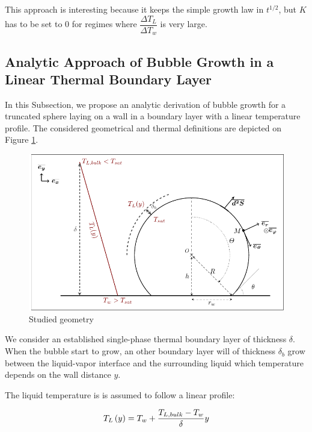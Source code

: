 \begin{remark*}{}
This approach is interesting because it keeps the simple growth law in $t^{1/2}$, but $K$ has to be set to 0 for regimes where $\dfrac{\Delta T_{L}}{\Delta T_{w}}$ is very large.%
\end{remark*}


\subsection{Analytic Approach of Bubble Growth in a Linear Thermal Boundary Layer}

In this Subsection, we propose an analytic derivation of bubble growth for a truncated sphere laying on a wall in a boundary layer with a linear temperature profile. The considered geometrical and thermal definitions are depicted on Figure \ref{fig:anal_growth}.


\begin{figure}[h!]
\centering
\includegraphics[width=0.7\linewidth]{img/growth/growth_analytical.pdf}
\caption{Studied geometry}
\label{fig:anal_growth}
\end{figure}

We consider an established single-phase thermal boundary layer of thickness $\delta$. When the bubble start to grow, an other boundary layer will of thickness $\delta_{b}$ grow between the liquid-vapor interface and the surrounding liquid which temperature depends on the wall distance $y$.


\npar


The liquid temperature is is assumed to follow a linear profile:

\begin{align}
T_{L}\left( y \right)=T_{w}+\frac{T_{L,bulk}-T_{w}}{\delta} y
\end{align}


